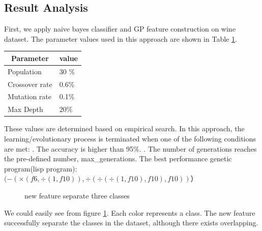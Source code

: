 \documentclass[11pt, a4paper, oneside, openright]{article}
\begin{document}
\subsection{Result Analysis}
First, we apply naive bayes classifier and GP feature construction on wine dataset.
The parameter values used in this approach are shown in Table \ref{tab:Parameters}. 
\begin{table}[H]
\centering
{}
\begin{tabular}{|l|l|}
\hline
\multicolumn{1}{|c|}{\textbf{Parameter}} & \multicolumn{1}{c|}{\textbf{value}} \\
\hline
Population &30 \%                                    \\
Crossover rate    &0.6\%                                  \\
Mutation rate   &0.1\%                                             \\
Max Depth   &20\%                                             \\
\hline
\end{tabular}
\label{tab:Parameters}
\end{table}

These values are determined based on empirical search. In this approach, the learning/evolutionary process is terminated when one of the following conditions are met:
. The accuracy is higher than 95\%.
. The number of generations reaches the pre-defined number, max\_generations.
The best performance genetic program(lisp program):
\newline \hspace * {4cm} $(- ( \times (f6,  \div (1, f10)),  \div ( \div ( \div (1, f10), f10), f10))）$
  \begin{figure}[!ht]
  \centerline{}
  \caption{new feature separate three classes}
  \label{fig:classes}
  \end{figure}
\newline We could easily see from figure \ref{fig:classes}. Each color represents a class. The new feature successfully separate the classes in the dataset, although there exists overlapping.
\end{document}
